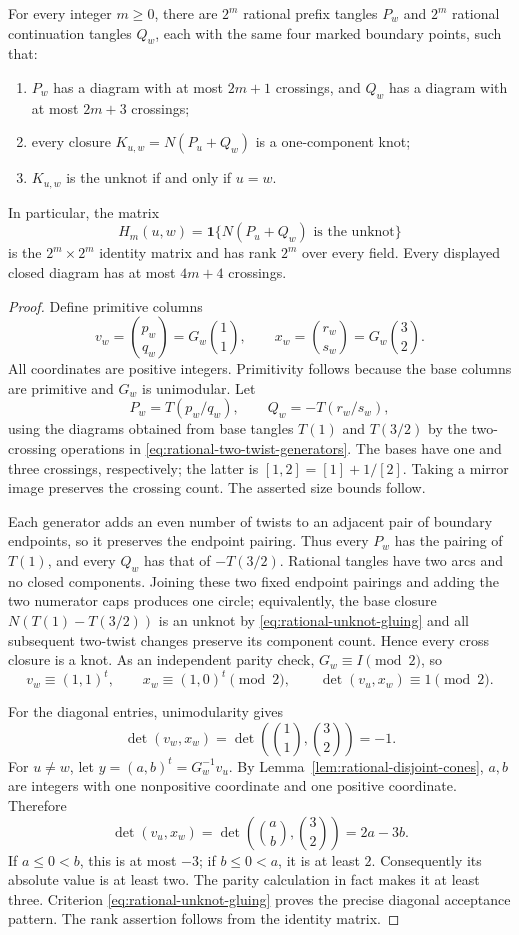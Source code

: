 \begin{theorem}
\label{thm:rational-boolean-identity}
For every integer $m\ge0$, there are $2^m$ rational prefix tangles $P_w$
and $2^m$ rational continuation tangles $Q_w$, each with the same four
marked boundary points, such that:
\begin{enumerate}
 \item $P_w$ has a diagram with at most $2m+1$ crossings, and $Q_w$
       has a diagram with at most $2m+3$ crossings;
 \item every closure $K_{u,w}=N(P_u+Q_w)$ is a one-component knot;
 \item $K_{u,w}$ is the unknot if and only if $u=w$.
\end{enumerate}
In particular, the matrix
\[
 H_m(u,w)=\mathbf 1\{N(P_u+Q_w)\text{ is the unknot}\}
\]
is the $2^m\times2^m$ identity matrix and has rank $2^m$ over every field.
Every displayed closed diagram has at most $4m+4$ crossings.
\end{theorem}

\begin{proof}
Define primitive columns
\[
 v_w=\binom{p_w}{q_w}=G_w\binom11,
 \qquad
 x_w=\binom{r_w}{s_w}=G_w\binom32.
\]
All coordinates are positive integers.  Primitivity follows because the
base columns are primitive and $G_w$ is unimodular.  Let
\[
 P_w=T(p_w/q_w),\qquad Q_w=-T(r_w/s_w),
\]
using the diagrams obtained from base tangles $T(1)$ and $T(3/2)$ by the
two-crossing operations in \eqref{eq:rational-two-twist-generators}.
The bases have one and three crossings, respectively; the latter is
$[1,2]=[1]+1/[2]$.  Taking a mirror image preserves the crossing count.
The asserted size bounds follow.

Each generator adds an even number of twists to an adjacent pair of
boundary endpoints, so it preserves the endpoint pairing.  Thus every
$P_w$ has the pairing of $T(1)$, and every $Q_w$ has that of $-T(3/2)$.
Rational tangles have two arcs and no closed components.  Joining these
two fixed endpoint pairings and adding the two numerator caps produces
one circle; equivalently, the base closure $N(T(1)-T(3/2))$ is an unknot
by \eqref{eq:rational-unknot-gluing} and all subsequent two-twist changes
preserve its component count.  Hence every cross closure is a knot.
As an independent parity check, $G_w\equiv I\pmod2$, so
\[
 v_w\equiv(1,1)^t,\qquad x_w\equiv(1,0)^t\pmod2,
 \qquad \det(v_u,x_w)\equiv1\pmod2.
\]

For the diagonal entries, unimodularity gives
\[
 \det(v_w,x_w)=\det\left(\binom11,\binom32\right)=-1.
\]
For $u\ne w$, let $y=(a,b)^t=G_w^{-1}v_u$.  By
Lemma~\ref{lem:rational-disjoint-cones}, $a,b$ are integers with one
nonpositive coordinate and one positive coordinate.  Therefore
\[
 \det(v_u,x_w)=\det\left(\binom ab,\binom32\right)=2a-3b.
\]
If $a\le0<b$, this is at most $-3$; if $b\le0<a$, it is at least $2$.
Consequently its absolute value is at least two.  The parity calculation
in fact makes it at least three.  Criterion
\eqref{eq:rational-unknot-gluing} proves the precise diagonal acceptance
pattern.  The rank assertion follows from the identity matrix.
\end{proof}

